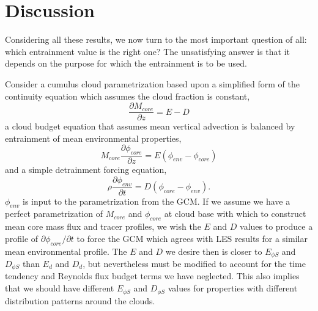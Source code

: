 \documentclass[12pt]{article}
\begin{document}

\section{Discussion}

Considering all these results, we now turn to the most important question of 
all: which entrainment value is the right one?  The unsatisfying answer is that
it depends on the purpose for which the entrainment is to be used.

Consider a cumulus cloud parametrization based upon a simplified form of the 
continuity equation which assumes the cloud fraction is constant,
\begin{equation}
    \label{eq:simple_continuity}
    \frac{\partial M_{core}}{\partial z} = E - D
\end{equation}
a cloud budget equation that assumes mean vertical advection is balanced by 
entrainment of mean environmental properties,
\begin{equation}
    \label{eq:simple_cloud_budget}
    M_{core} \frac{\partial \phi_{core}}{\partial z} = 
    E(\phi_{env} - \phi_{core})
\end{equation}
and a simple detrainment forcing equation,
\begin{equation}
    \label{eq:simple_env_budget}
    \rho \frac{\partial \phi_{env}}{\partial t} = D(\phi_{core} - \phi_{env}).
\end{equation}
$\phi_{env}$ is input to the parametrization from the GCM.  If we assume 
we have a perfect parametrization of $M_{core}$ and $\phi_{core}$ at cloud 
base with which to construct mean core mass flux and tracer profiles, we wish 
the $E$ and $D$ values to produce a profile of 
$\partial \phi_{core} / \partial t$ to force the GCM which agrees with LES 
results for a similar mean environmental profile.  The $E$ and $D$ we desire 
then is closer to $E_{\phi S}$ and $D_{\phi S}$ than $E_d$ and $D_d$, but 
nevertheless must be modified to account for the time tendency and Reynolds 
flux budget terms we have neglected.  This also implies that we should have 
different $E_{\phi S}$ and $D_{\phi S}$ values for properties with different 
distribution patterns around the clouds.
\end{document}
